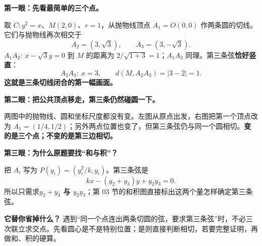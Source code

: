 \clearpage
\begin{explanationbox}
\textbf{第一眼：先看最简单的三个点。}

取 $C:y^2=x$、$M(2,0)$、$r=1$，从抛物线顶点 $A_1=O(0,0)$ 作两条圆的切线。它们与抛物线再次相交于
\[
A_2=(3,\sqrt3),\qquad A_3=(3,-\sqrt3).
\]
$A_1A_2:\ x-\sqrt3y=0$ 到 $M$ 的距离为 $2/\sqrt{1+3}=1$；$A_1A_3$ 同理。第三条弦\textbf{恰好竖直}：
\[
A_2A_3:\ x=3,\qquad d(M,A_2A_3)=|3-2|=1.
\]
\textbf{这就是三条切线闭合的第一幅画面。}

\medskip
\textbf{第二眼：把公共顶点移走，第三条仍然碰圆一下。}
\begin{center}

\end{center}
两图中的抛物线、圆和坐标尺度都没有变。左图从原点出发，右图把第一个顶点改为 $A_1=(1/4,1/2)$；另外两点位置也变了，但第三条弦仍与同一个圆相切。\textbf{变的是三个点；不变的是第三边相切。}

\medskip
\textbf{第三眼：为什么原题要找“和与积”？}

把 $A_i$ 写为 $P(y_i)=(y_i^2/k,y_i)$。第三条弦是
\[
\boxed{kx-(y_2+y_3)y+y_2y_3=0}.
\]
所以只需求\textbf{$y_2+y_3$ 与 $y_2y_3$}；第 03 节的和积图直接标出这两个量怎样确定第三条弦。

\medskip
\textbf{它替你省掉什么？} 遇到“同一个点连出两条切圆的弦，要求第三条弦”时，不必三次联立求交点。先看圆心是不是特别位置；是则直接判断相切，若要完整证明，再做和、积的硬算。
\end{explanationbox}
